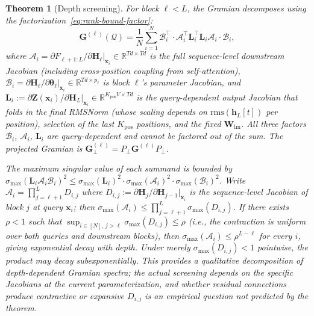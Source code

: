 \documentclass{article}
\newtheorem{theorem}{Theorem}
\newcommand{\R}{\mathbb{R}}
\newcommand{\cQ}{\mathcal{Q}}
\newcommand{\btheta}{\boldsymbol{\theta}}
\newcommand{\bh}{\mathbf{h}}
\newcommand{\bx}{\mathbf{x}}
\newcommand{\bW}{\mathbf{W}}
\newcommand{\bG}{\mathbf{G}}
\newcommand{\bH}{\mathbf{H}}
\newcommand{\bZ}{\mathbf{Z}}
\newcommand{\bL}{\mathbf{L}}
\newcommand{\cA}{\mathcal{A}}
\newcommand{\cB}{\mathcal{B}}
\begin{document}
\begin{theorem}[Depth screening]
\label{thm:screening}
For block $\ell < L$, the Gramian decomposes using the factorization~\eqref{eq:rank-bound-factor}:
\begin{equation}\label{eq:screening}
    \bG^{(\ell)}(\cQ) = \frac{1}{N}\sum_{i=1}^{N} \cB_i^\top \cdot \cA_i^\top \bL_i^\top \bL_i \cA_i \cdot \cB_i,
\end{equation}
where $\cA_i = \partial F_{\ell+1:L}/\partial \bH_\ell|_{\bx_i} \in \R^{Td \times Td}$ is the full sequence-level downstream Jacobian (including cross-position coupling from self-attention), $\cB_i = \partial \bH_\ell / \partial \btheta_\ell|_{\bx_i} \in \R^{Td \times p_\ell}$ is block $\ell$'s parameter Jacobian, and $\bL_i := \partial \bZ(\bx_i)/\partial \bH_L|_{\bx_i} \in \R^{K_\text{pos} V \times Td}$ is the query-dependent output Jacobian that folds in the final RMSNorm (whose scaling depends on $\mathrm{rms}(\bh_L[t])$ per position), selection of the last $K_\text{pos}$ positions, and the fixed $\bW_{\text{lm}}$.  All three factors $\cB_i$, $\cA_i$, $\bL_i$ are query-dependent and cannot be factored out of the sum.  The projected Gramian is $\bG_\perp^{(\ell)} = P_\perp \bG^{(\ell)} P_\perp$.

The maximum singular value of each summand is bounded by $\sigma_{\max}(\bL_i \cA_i \cB_i)^2 \leq \sigma_{\max}(\bL_i)^2 \cdot \sigma_{\max}(\cA_i)^2 \cdot \sigma_{\max}(\cB_i)^2$.  Write $\cA_i = \prod_{j=\ell+1}^{L} D_{i,j}$ where $D_{i,j} := \partial \bH_j/\partial \bH_{j-1}|_{\bx_i}$ is the sequence-level Jacobian of block $j$ at query $\bx_i$; then $\sigma_{\max}(\cA_i) \leq \prod_{j=\ell+1}^{L} \sigma_{\max}(D_{i,j})$.  If there exists $\rho < 1$ such that $\sup_{i \in [N],\, j > \ell} \sigma_{\max}(D_{i,j}) \leq \rho$ (i.e., the contraction is uniform over both queries and downstream blocks), then $\sigma_{\max}(\cA_i) \leq \rho^{L-\ell}$ for every $i$, giving exponential decay with depth.  Under merely $\sigma_{\max}(D_{i,j}) < 1$ pointwise, the product may decay subexponentially.  This provides a qualitative decomposition of depth-dependent Gramian spectra; the actual screening depends on the specific Jacobians at the current parameterization, and whether residual connections produce contractive or expansive $D_{i,j}$ is an empirical question not predicted by the theorem.
\end{theorem}
\end{document}
